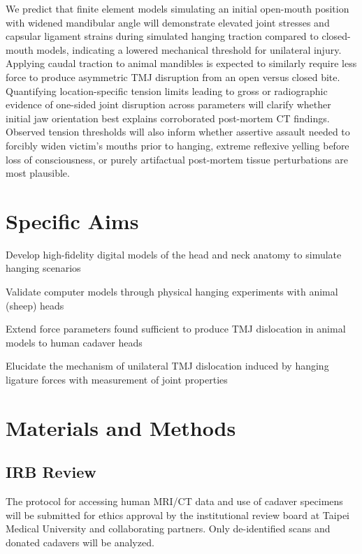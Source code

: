 \documentclass{article}
\newcommand{\tmu}{Taipei Medical University }
\begin{document}
We predict that finite element models simulating an initial open-mouth position with widened mandibular angle will demonstrate elevated joint stresses and capsular ligament strains during simulated hanging traction compared to closed-mouth models, indicating a lowered mechanical threshold for unilateral injury.
Applying caudal traction to animal mandibles is expected to similarly require less force to produce asymmetric TMJ disruption from an open versus closed bite. Quantifying location-specific tension limits leading to gross or radiographic evidence of one-sided joint disruption across parameters will clarify whether initial jaw orientation best explains corroborated post-mortem CT findings.
Observed tension thresholds will also inform whether assertive assault needed to forcibly widen victim’s mouths prior to hanging, extreme reflexive yelling before loss of consciousness, or purely artifactual post-mortem tissue perturbations are most plausible.

%
\section{Specific Aims}
\begin{outline}
\1 Develop high-fidelity digital models of the head and neck anatomy to simulate hanging scenarios

\1 Validate computer models through physical hanging experiments with animal (sheep) heads  

\1 Extend force parameters found sufficient to produce TMJ dislocation in animal models to human cadaver heads

\1 Elucidate the mechanism of unilateral TMJ dislocation induced by hanging ligature forces with measurement of joint properties

\end{outline}

\section{Materials and Methods}

\subsection{IRB Review}
The protocol for accessing human MRI/CT data and use of cadaver specimens will be submitted for ethics approval by the institutional review board at \tmu and collaborating partners. Only de-identified scans and donated cadavers will be analyzed.
\end{document}

